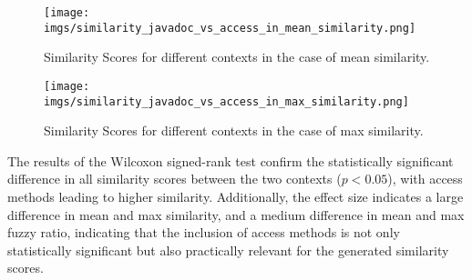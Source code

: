  


\begin{figure}[h] \centering \texttt{[image: imgs/similarity\_javadoc\_vs\_access\_in\_mean\_similarity.png]} 
\vspace{-10pt} 

\caption{Similarity Scores for different contexts in the case of mean similarity.} \label{fig:similarity_javadoc_vs_access_in_mean_similarity} \end{figure}


\begin{figure}[h] \centering \texttt{[image: imgs/similarity\_javadoc\_vs\_access\_in\_max\_similarity.png]} 
\vspace{-10pt} 

\caption{Similarity Scores for different contexts in the case of max similarity.} \label{fig:similarity_javadoc_vs_access_in_max_similarity} \end{figure}

The results of the Wilcoxon signed-rank test confirm the statistically significant difference in all similarity scores between the two contexts ($p < 0.05$), with access methods leading to higher similarity. 
Additionally, the effect size indicates a large difference in mean and max similarity, and a medium difference in mean and max fuzzy ratio, indicating that the inclusion of access methods is not only statistically significant but also practically relevant for the generated similarity scores.

